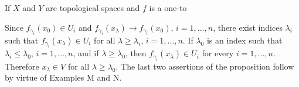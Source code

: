 If $X$ and $Y$ are topological spaces and $f$ is a one-to

Since $f_{\gamma_i}(x_0) \in U_i$ and $f_{\gamma_i}(x_\lambda) \rightarrow f_{\gamma_i}(x_0)$, $i = 1, \ldots, n$, there exist indices $\lambda_i$ such that $f_{\gamma_i}(x_\lambda) \in U_i$ for all $\lambda \geq \lambda_i$, $i = 1, \ldots, n$. If $\lambda_0$ is an index such that $\lambda_i \leq \lambda_0$, $i = 1, \ldots, n$, and if $\lambda \geq \lambda_0$, then $f_{\gamma_i}(x_\lambda) \in U_i$ for every $i = 1, \ldots, n$. Therefore $x_\lambda \in V$ for all $\lambda \geq \lambda_0$. The last two assertions of the proposition follow by virtue of Examples M and N.
